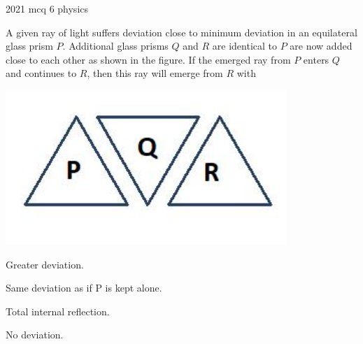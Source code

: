 \ylDisplay
{}%
{2021}%
{mcq}%
{6}%
{physics}%
{}%
{
\ifStatement
A given ray of light suffers deviation close to minimum deviation in an equilateral glass prism $P$. Additional glass prisms $Q$ and $R$ are identical to $P$ are now added close to each other as shown in the figure. If the emerged ray from $P$ enters $Q$ and continues to $R$, then this ray will emerge from $R$ with
\begin{center}
  \includegraphics[width=0.3\linewidth]{2021-mcq-06-p}
\end{center}
\fi


Greater deviation.
\fi


Same deviation as if P is kept alone.
\fi


Total internal reflection.
\fi


No deviation.
\fi


\ifHint

\fi


\ifSolution

\fi


\ifEstStatement

\fi



\fi



\fi



\fi



\fi


\ifEstHint

\fi


\ifEstSolution

\fi
}
